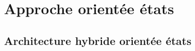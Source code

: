 \section{Approche orientée états}

\begin{frame}
	\begin{minipage}{0.5\columnwidth}
		\tableofcontents[
		currentsubsection,
		sectionstyle=show/shaded,
		subsectionstyle=show/show/hide,
		]
	\end{minipage}\hfill
	\begin{minipage}{0.5\columnwidth}
	\end{minipage}
\end{frame}

\subsection{Architecture hybride orientée états}


